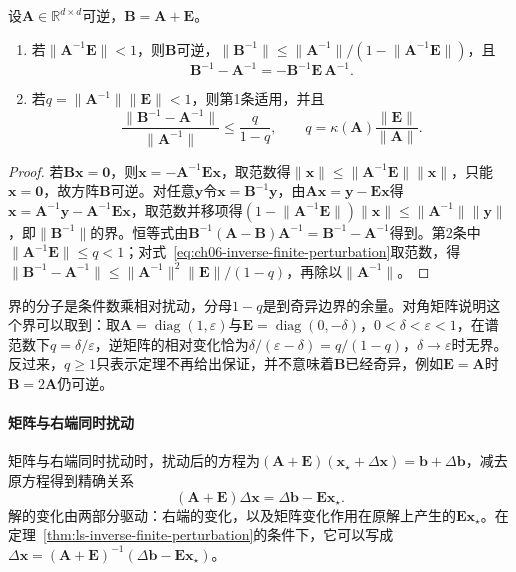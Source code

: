 \begin{theorem}[逆矩阵的有限扰动]
\label{thm:ls-inverse-finite-perturbation}
设$\bm A\in\mathbb R^{d\times d}$可逆，$\bm B=\bm A+\bm E$。
\begin{enumerate}
 \item 若$\lVert\bm A^{-1}\bm E\rVert<1$，则$\bm B$可逆，$\lVert\bm B^{-1}\rVert\leq\lVert\bm A^{-1}\rVert/(1-\lVert\bm A^{-1}\bm E\rVert)$，且
 \begin{equation}
  \bm B^{-1}-\bm A^{-1}=-\bm B^{-1}\bm E\,\bm A^{-1}.
  \label{eq:ch06-inverse-finite-perturbation}
 \end{equation}
 \item 若$q=\lVert\bm A^{-1}\rVert\lVert\bm E\rVert<1$，则第1条适用，并且
 \[
  \frac{\lVert\bm B^{-1}-\bm A^{-1}\rVert}{\lVert\bm A^{-1}\rVert}
  \leq\frac{q}{1-q},\qquad q=\kappa(\bm A)\frac{\lVert\bm E\rVert}{\lVert\bm A\rVert}.
 \]
\end{enumerate}
\end{theorem}
\begin{proof}
若$\bm B\bm x=\bm0$，则$\bm x=-\bm A^{-1}\bm E\bm x$，取范数得$\lVert\bm x\rVert\leq\lVert\bm A^{-1}\bm E\rVert\lVert\bm x\rVert$，只能$\bm x=\bm0$，故方阵$\bm B$可逆。对任意$\bm y$令$\bm x=\bm B^{-1}\bm y$，由$\bm A\bm x=\bm y-\bm E\bm x$得$\bm x=\bm A^{-1}\bm y-\bm A^{-1}\bm E\bm x$，取范数并移项得$(1-\lVert\bm A^{-1}\bm E\rVert)\lVert\bm x\rVert\leq\lVert\bm A^{-1}\rVert\lVert\bm y\rVert$，即$\lVert\bm B^{-1}\rVert$的界。恒等式由$\bm B^{-1}(\bm A-\bm B)\bm A^{-1}=\bm B^{-1}-\bm A^{-1}$得到。第2条中$\lVert\bm A^{-1}\bm E\rVert\leq q<1$；对式~\eqref{eq:ch06-inverse-finite-perturbation}取范数，得$\lVert\bm B^{-1}-\bm A^{-1}\rVert\leq\lVert\bm A^{-1}\rVert^2\lVert\bm E\rVert/(1-q)$，再除以$\lVert\bm A^{-1}\rVert$。
\end{proof}

界的分子是条件数乘相对扰动，分母$1-q$是到奇异边界的余量。对角矩阵说明这个界可以取到：取$\bm A=\operatorname{diag}(1,\varepsilon)$与$\bm E=\operatorname{diag}(0,-\delta)$，$0<\delta<\varepsilon<1$，在谱范数下$q=\delta/\varepsilon$，逆矩阵的相对变化恰为$\delta/(\varepsilon-\delta)=q/(1-q)$，$\delta\to\varepsilon$时无界。反过来，$q\geq1$只表示定理不再给出保证，并不意味着$\bm B$已经奇异，例如$\bm E=\bm A$时$\bm B=2\bm A$仍可逆。

\paragraph{矩阵与右端同时扰动}
矩阵与右端同时扰动时，扰动后的方程为$(\bm A+\bm E)(\bm x_\star+\Delta\bm x)=\bm b+\Delta\bm b$，减去原方程得到精确关系
\begin{equation}
 (\bm A+\bm E)\Delta\bm x=\Delta\bm b-\bm E\bm x_\star .
 \label{eq:ls-joint-perturbation-exact}
\end{equation}
解的变化由两部分驱动：右端的变化，以及矩阵变化作用在原解上产生的$\bm E\bm x_\star$。在定理~\ref{thm:ls-inverse-finite-perturbation}的条件下，它可以写成$\Delta\bm x=(\bm A+\bm E)^{-1}(\Delta\bm b-\bm E\bm x_\star)$。


